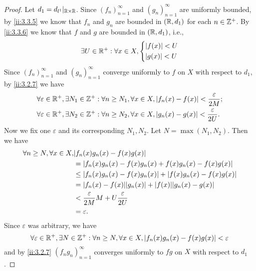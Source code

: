 \begin{proof}
  Let \(d_1 = d_{l^1}|_{\mathbb{R} \times \mathbb{R}}\).
  Since \((f_n)_{n = 1}^\infty\) and \((g_n)_{n = 1}^\infty\) are uniformly bounded, by \cref{ii:3.3.5} we know that \(f_n\) and \(g_n\) are bounded in \((\mathbb{R}, d_1)\) for each \(n \in \mathbb{Z}^+\).
  By \cref{ii:3.3.6} we know that \(f\) and \(g\) are bounded in \((\mathbb{R}, d_1)\), i.e.,
  \[
    \exists U \in \mathbb{R}^+ : \forall x \in X, \begin{dcases}
      \left\lvert f(x)\right\rvert < U \\
      \left\lvert g(x)\right\rvert < U
    \end{dcases}
  \]
  Since \((f_n)_{n = 1}^\infty\) and \((g_n)_{n = 1}^\infty\) converge uniformly to \(f\) on \(X\) with respect to \(d_1\), by \cref{ii:3.2.7} we have
  \begin{align*}
     & \forall \varepsilon \in \mathbb{R}^+, \exists N_1 \in \mathbb{Z}^+ : \forall n \geq N_1, \forall x \in X, \left\lvert f_n(x) - f(x)\right\rvert < \dfrac{\varepsilon}{2M}; \\
     & \forall \varepsilon \in \mathbb{R}^+, \exists N_2 \in \mathbb{Z}^+ : \forall n \geq N_2, \forall x \in X, \left\lvert g_n(x) - g(x)\right\rvert < \dfrac{\varepsilon}{2U}.
  \end{align*}
  Now we fix one \(\varepsilon\) and its corresponding \(N_1, N_2\).
  Let \(N = \max(N_1, N_2)\).
  Then we have
  \begin{align*}
    \forall n \geq N, \forall x \in X, & \abs{f_n(x) g_n(x) - f(x) g(x)}                                        \\
                                       & = \abs{f_n(x) g_n(x) - f(x) g_n(x) + f(x) g_n(x) - f(x) g(x)}          \\
                                       & \leq \abs{f_n(x) g_n(x) - f(x) g_n(x)} + \abs{f(x) g_n(x) - f(x) g(x)} \\
                                       & = \abs{f_n(x) - f(x)} \abs{g_n(x)} + \abs{f(x)} \abs{g_n(x) - g(x)}    \\
                                       & < \dfrac{\varepsilon}{2M} M + U \dfrac{\varepsilon}{2U}                \\
                                       & = \varepsilon.
  \end{align*}
  Since \(\varepsilon\) was arbitrary, we have
  \[
    \forall \varepsilon \in \mathbb{R}^+, \exists N \in \mathbb{Z}^+ : \forall n \geq N, \forall x \in X, \left\lvert f_n(x) g_n(x) - f(x) g(x)\right\rvert < \varepsilon
  \]
  and by \cref{ii:3.2.7} \((f_n g_n)_{n = 1}^\infty\) converges uniformly to \(fg\) on \(X\) with respect to \(d_1\).
\end{proof}
